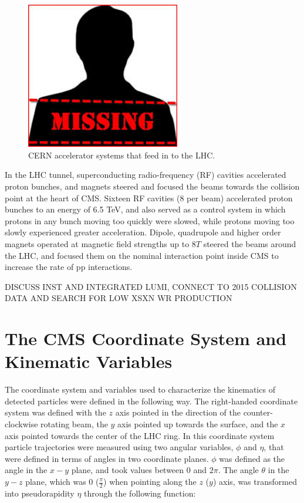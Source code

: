 \begin{figure}[ht]
	\centering
	\includegraphics[width=0.6\textwidth]{figures/missingImage.png}
	\caption{CERN accelerator systems that feed in to the LHC.}
	\label{fig:accelComplex}
\end{figure}


In the LHC tunnel, superconducting radio-frequency (RF) cavities accelerated proton bunches, and magnets steered and 
focused the beams towards the collision point at the heart of CMS.  Sixteen RF cavities (8 per beam) accelerated proton 
bunches to an energy of 6.5 TeV, and also served as a control system in which protons in any bunch moving too quickly 
were slowed, while protons moving too slowly experienced greater acceleration.  Dipole, quadrupole and higher order 
magnets operated at magnetic field strengths up to 8$\unit{T}$ steered the beams around the LHC, and focused them 
on the nominal interaction point inside CMS to increase the rate of pp interactions.

DISCUSS INST AND INTEGRATED LUMI, CONNECT TO 2015 COLLISION DATA AND SEARCH FOR LOW XSXN WR PRODUCTION

\section{The CMS Coordinate System and Kinematic Variables}
\label{sec:coordinateSystemAndKinematicVars}
The coordinate system and variables used to characterize the kinematics of detected particles were defined in 
the following way.  The right-handed coordinate system was defined with the $z$ axis pointed in the direction 
of the counter-clockwise rotating beam, the $y$ axis pointed up towards the surface, and the $x$ axis pointed towards 
the center of the LHC ring.  In this coordinate system particle trajectories were measured using two angular 
variables, $\phi$ and $\eta$, that were defined in terms of angles in two coordinate planes.  $\phi$ was defined 
as the angle in the $x-y$ plane, and took values between 0 and $2\pi$.  The angle $\theta$ in the $y-z$ plane, 
which was 0 ($\frac{\pi}{2}$) when pointing along the $z$ ($y$) axis, was transformed into pseudorapidity 
$\eta$ through the following function:

